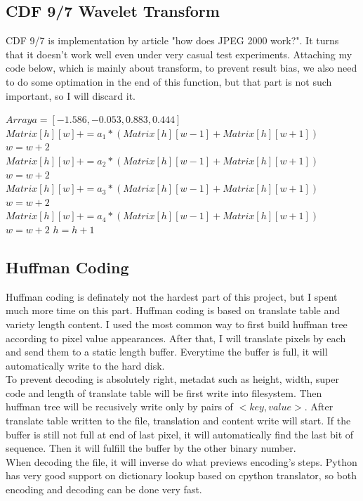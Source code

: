 \documentclass[UTF8, letterpaper, 14pt]{article}
\begin{document}
\subsection{CDF 9/7 Wavelet Transform}
CDF 9/7 is implementation by article "how does JPEG 2000 work?".\cite{jpeg2kwork} It turns that it doesn't work well even under very casual test experiments. Attaching my code below, which is mainly about transform, to prevent result bias, we also need to do some optimation in the end of this function, but that part is not such important, so I will discard it.
\begin{spacing}{0.7}
\begin{algorithm}[htb]
\caption{2D CDF 9/7 Discrete Cosine Transform}
   \begin{algorithmic}[1]
   	  \State $ Array a = [-1.586, -0.053, 0.883, 0.444]$ 
        			\State $Matrix[h][w] += a_1 * (Matrix[h][w-1] + Matrix[h][w+1])$
        			\State $w = w + 2$
        		\EndFor
        			\State $Matrix[h][w] += a_2 * (Matrix[h][w-1] + Matrix[h][w+1])$
        			\State $w = w + 2$
        		\EndFor
        			\State $Matrix[h][w] += a_3 * (Matrix[h][w-1] + Matrix[h][w+1])$
        			\State $w = w + 2$
        		\EndFor
        			\State $Matrix[h][w] += a_4 * (Matrix[h][w-1] + Matrix[h][w+1])$
        			\State $w = w + 2$
        		\EndFor
        		\State $h = h + 1$
        \EndFor
       \EndFunction    
\end{algorithmic}
\end{algorithm}
\end{spacing}
\subsection{Huffman Coding}
Huffman coding is definately not the hardest part of this project, but I spent much more time on this part. Huffman coding is based on translate table and variety length content. I used the most common way to first build huffman tree according to pixel value appearances. After that, I will translate pixels by each and send them to a static length buffer. Everytime the buffer is full, it will automatically write to the hard disk. \\
To prevent decoding is absolutely right, metadat such as height, width, super code and length of translate table will be first write into filesystem. Then huffman tree will be recusively write only by pairs of $<key, value>$. After translate table written to the file, translation and content write will start. If the buffer is still not full at end of last pixel, it will automatically find the last bit of sequence. Then it will fulfill the buffer by the other binary number. \\  
When decoding the file, it will inverse do what previews encoding's steps. Python has very good support on dictionary lookup based on cpython translator, so both encoding and decoding can be done very fast.
\end{document}
